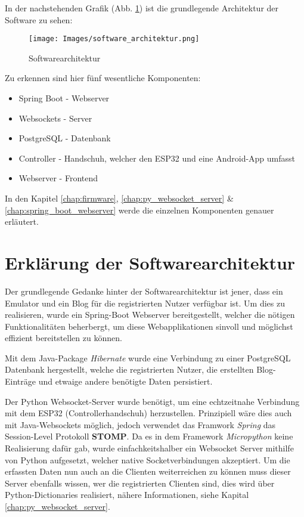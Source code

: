 \documentclass[paper=a4,12pt]{scrreprt}
\begin{document}
In der nachstehenden Grafik (Abb. \ref{fig:soft_arch}) ist die grundlegende Architektur der Software zu sehen:

\begin{figure}[H]
  \centering
  \texttt{[image: Images/software\_architektur.png]}
  \caption{Softwarearchitektur}
  \label{fig:soft_arch}
\end{figure}

Zu erkennen sind hier fünf wesentliche Komponenten:\newline

\begin{itemize}
  \item Spring Boot\cite{springboot} - Webserver
  \item Websockets\cite{websockets_library} - Server
  \item PostgreSQL\cite{postgres} - Datenbank
  \item Controller - Handschuh, welcher den ESP32\cite{esp32} und eine Android\cite{android_java}-App umfasst
  \item Webserver - Frontend
\end{itemize}
In den Kapitel \ref{chap:firmware}, \ref{chap:py_websocket_server} \& \ref{chap:spring_boot_webserver} werde die einzelnen Komponenten genauer erläutert.\newline

\section{Erklärung der Softwarearchitektur}
\label{sec:software_arch_2}


Der grundlegende Gedanke hinter der Softwarearchitektur ist jener, dass ein Emulator und ein Blog für die registrierten Nutzer verfügbar ist. Um dies zu realisieren, wurde ein Spring-Boot
Webserver bereitgestellt, welcher die nötigen Funktionalitäten beherbergt, um diese Webapplikationen sinvoll und möglichst effizient bereitstellen zu können.\newline

Mit dem Java-Package \textit{Hibernate}\cite{hibernate} wurde eine Verbindung zu einer PostgreSQL Datenbank hergestellt, welche
die registrierten Nutzer, die erstellten Blog-Einträge und etwaige andere benötigte Daten persistiert.\newline

Der Python Websocket-Server wurde benötigt, um eine echtzeitnahe Verbindung mit dem ESP32 (Controllerhandschuh) herzustellen. Prinzipiell wäre dies auch mit Java-Websockets möglich, jedoch
verwendet das Framwork \textit{Spring} das Session-Level Protokoll \textbf{STOMP}\cite{stomp}. Da es in dem Framework \textit{Micropython}\cite{micropython} keine Realisierung dafür gab, wurde einfachkeitshalber ein Websocket Server
mithilfe von Python aufgesetzt, welcher native Socketverbindungen akzeptiert. Um die erfassten Daten nun auch an die Clienten weiterreichen zu können muss dieser Server ebenfalls wissen, wer die registrierten Clienten sind, dies wird über Python-Dictionaries realisiert,
nähere Informationen, siehe Kapital \ref{chap:py_websocket_server}.\\
\end{document}
